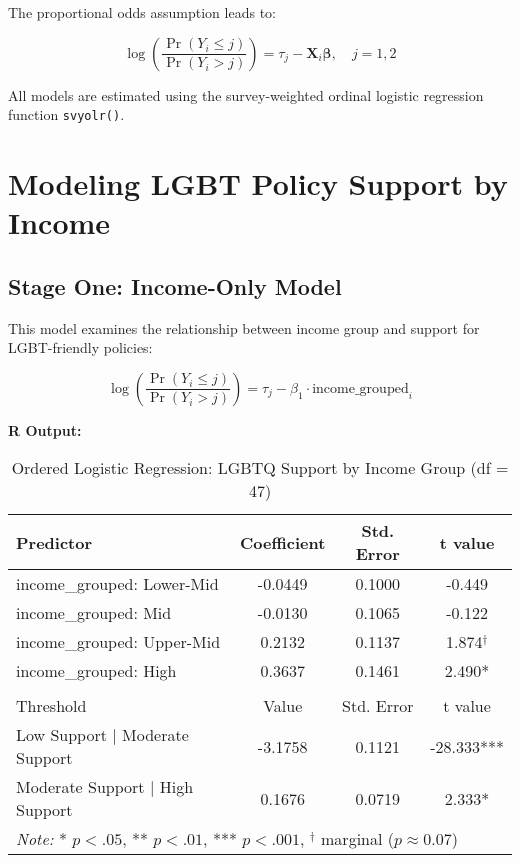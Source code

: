 \documentclass{article}
\begin{document}
The proportional odds assumption leads to:

\[
\log \left( \frac{\Pr(Y_i \leq j)}{\Pr(Y_i > j)} \right) = \tau_j - \mathbf{X}_i \boldsymbol{\beta}, \quad j = 1, 2
\]

All models are estimated using the survey-weighted ordinal logistic regression function \texttt{svyolr()}.


\section{Modeling LGBT Policy Support by Income}

\subsection{Stage One: Income-Only Model}

This model examines the relationship between income group and support for LGBT-friendly policies:

\[
\log \left( \frac{\Pr(Y_i \leq j)}{\Pr(Y_i > j)} \right) = \tau_j - \beta_1 \cdot \text{income\_grouped}_i
\]

\textbf{R Output:}
\begin{table}[H]
    \centering
    \caption{Ordered Logistic Regression: LGBTQ Support by Income Group (df = 47)}
    \begin{tabular}{lccc}
    \hline
    \textbf{Predictor} & \textbf{Coefficient} & \textbf{Std. Error} & \textbf{t value} \\
    \hline
    income\_grouped: Lower-Mid & -0.0449 & 0.1000 & -0.449 \\
    income\_grouped: Mid & -0.0130 & 0.1065 & -0.122 \\
    income\_grouped: Upper-Mid & 0.2132 & 0.1137 & 1.874$^\dagger$ \\
    income\_grouped: High & 0.3637 & 0.1461 & 2.490* \\
    \hline
    \addlinespace[0.5em]
    \multicolumn{4}{l}{\textbf{Intercepts}} \\
    \hline
    Threshold & Value & Std. Error & t value \\
    \hline
    Low Support $|$ Moderate Support & -3.1758 & 0.1121 & -28.333*** \\
    Moderate Support $|$ High Support & 0.1676 & 0.0719 & 2.333* \\
    \hline
    \multicolumn{4}{l}{\textit{Note:} * $p < .05$, ** $p < .01$, *** $p < .001$, $^\dagger$ marginal ($p \approx 0.07$)} \\
    \end{tabular}
\end{table}
    
\end{document}
